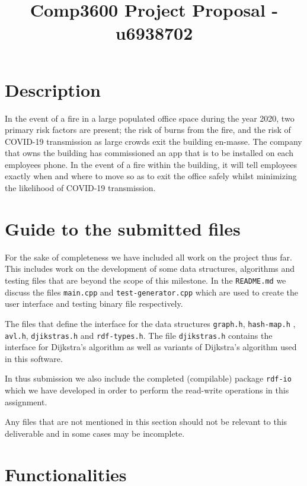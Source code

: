 \documentclass{article}
\title{Comp3600 Project Proposal - u6938702}
\date{\vspace{-15ex}}
\begin{document}
\fontsize{11}{14}\rm
\maketitle

\section{\fontsize{11}{11} Description}
In the event of a fire in a large populated office space during the year 2020, two primary risk factors are present; the risk of burns from the fire, and the risk of COVID-19 transmission as large crowds exit the building en-masse. The company that owns the building has commissioned an app that is to be installed on each employees phone. In the event of a fire within the building, it will tell employees exactly when and where to move so as to exit the office safely whilst minimizing the likelihood of COVID-19 transmission.

\section{Guide to the submitted files}

For the sake of completeness we have included all work on the project thus far. This includes work on the development of some data structures, algorithms and testing files that are beyond the scope of this milestone. In the \texttt{README.md} we discuss the files \texttt{main.cpp} and \texttt{test-generator.cpp} which are used to create the user interface and testing binary file respectively.

The files that define the interface for the data structures \texttt{graph.h}, \texttt{hash-map.h} , \texttt{avl.h}, \texttt{djikstras.h} and \texttt{rdf-types.h}. The file \texttt{djikstras.h} contains the interface for Dijkstra's algorithm as well as variants of Dijkstra's algorithm used in this software.

In thus submission we also include the completed (compilable) package \texttt{rdf-io} which we have developed in order to perform the read-write operations in this assignment.

Any files that are not mentioned in this section should not be relevant to this deliverable and in some cases may be incomplete.

\section{Functionalities}
\end{document}
